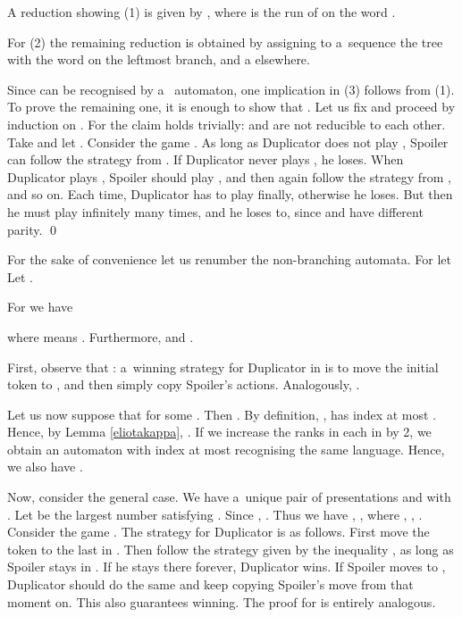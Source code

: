 \documentclass{LMCS}
\begin{document}
\proof A reduction showing (1) is given by , where
 is the run of  on the word .

For (2) the remaining reduction is obtained by assigning to a~sequence
 the tree with the word
 on the leftmost
branch, and a  elsewhere.

Since  can be recognised by a~
automaton, one implication in (3) follows from (1). To prove the
remaining one, it is enough to show that . Let us fix  and proceed by
induction on . For  the claim holds trivially:
 and  are not reducible to
each other. Take  and let . Consider the game . As long as
Duplicator does not play , Spoiler can follow the strategy
from . If Duplicator never plays
, he loses. When Duplicator plays , Spoiler should
play , and then again follow the strategy from ,
and so on. Each time, Duplicator has to play  finally,
otherwise he loses. But then he must play  infinitely many
times, and he loses to, since  and  have different
parity. \qed

\vspace{5pt}

For the sake of convenience let us renumber the non-branching automata. For  let 
Let  .\label{hat}

\begin{prop} \label{omegaorder}
For  we have

where  means . Furthermore,  and .
\end{prop}

\proof First, observe that : a~winning strategy for Duplicator in  is to move the initial token to , and then simply copy Spoiler's actions. Analogously, .

Let us now suppose that  for some . Then . 
By definition,  , has index at most  . Hence, by Lemma \ref{eliotakappa}, . If we increase the ranks in each  in  by 2, we obtain an automaton with index at most  recognising the same language. Hence, we also have .
 
Now, consider the general case.  We have a~unique pair of presentations  and  with . Let  be the largest number satisfying . Since , . Thus we have , , where , , .  Consider the game . The strategy for Duplicator is as follows. First move the token to the last  in . Then follow the strategy given by the inequality , as long as Spoiler stays in . If he stays there forever, Duplicator wins. If Spoiler moves to , Duplicator should do the same and keep copying Spoiler's move from that moment on. This also guarantees winning. The proof for  is entirely analogous.   
\end{document}
